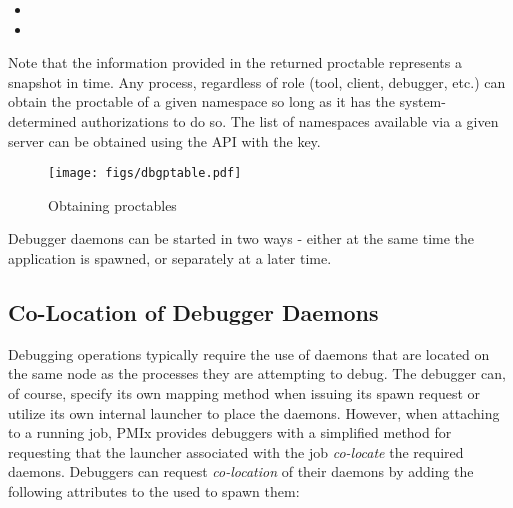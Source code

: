 \begin{itemize}
    \item {}
    \item {}
\end{itemize}

Note that the information provided in the returned proctable represents a snapshot in time. Any process, regardless of role (tool, client, debugger, etc.) can obtain the proctable of a given namespace so long as it has the system-determined authorizations to do so. The list of namespaces available via a given server can be obtained using the  \ac{API} with the  key.

\begingroup
\begin{figure*}[ht!]
  \begin{center}
    \texttt{[image: figs/dbgptable.pdf]}
  \end{center}
  \caption{Obtaining proctables}
  \label{fig:dbgptable}
\end{figure*}
\endgroup

Debugger daemons can be started in two ways - either at the same time the application is spawned, or separately at a later time.

\subsection{Co-Location of Debugger Daemons}
\label{chap:api_tools:colocate}

Debugging operations typically require the use of daemons that are located on
the same node as the processes they are attempting to debug. The debugger can,
of course, specify its own mapping method when issuing its spawn request or
utilize its own internal launcher to place the daemons. However, when attaching
to a running job, \ac{PMIx} provides debuggers with a simplified method for
requesting that the launcher associated with the job \emph{co-locate} the
required daemons. Debuggers can request \emph{co-location} of their daemons by
adding the following attributes to the  used to spawn them:

